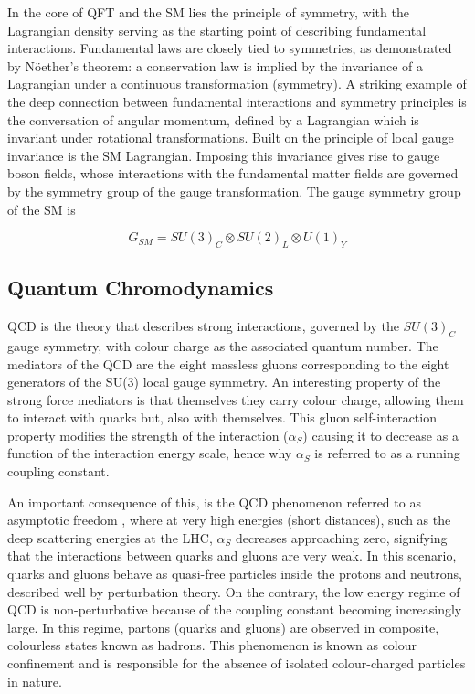 In the core of QFT and the SM lies the principle of symmetry, with the Lagrangian density serving as the starting point of describing fundamental interactions. Fundamental laws are closely tied to symmetries, as demonstrated by N\"{o}ether's theorem: a conservation law is implied by the invariance of a Lagrangian under a continuous transformation (symmetry). A striking example of the deep connection between fundamental interactions and symmetry principles is the conversation of angular momentum, defined by a Lagrangian which is invariant under rotational transformations. Built on the principle of local gauge invariance is the SM Lagrangian. Imposing this invariance gives rise to gauge boson fields, whose interactions with the fundamental matter fields are governed by the symmetry group of the gauge transformation. The gauge symmetry group of the SM is

\begin{equation}
G_{SM} = SU(3)_{C} \otimes SU(2)_{L} \otimes U(1)_{Y}
\end{equation}

\subsection{Quantum Chromodynamics}

\ac{QCD} is the theory that describes strong interactions, governed by the $SU(3)_{C}$ gauge symmetry, with colour charge as the associated quantum number. The mediators of the QCD are the eight massless gluons corresponding to the eight generators of the SU(3) local gauge symmetry. An interesting property of the strong force mediators is that themselves they carry colour charge, allowing them to interact with quarks but, also with themselves. This gluon self-interaction property modifies the strength of the interaction ($\alpha_{S}$) causing it to decrease as a function of the interaction energy scale, hence why $\alpha_{S}$ is referred to as a running coupling constant.

An important consequence of this, is the QCD phenomenon referred to as asymptotic freedom \cite{AsymptoticFreedom_1,AsymptoticFreedom_2}, where at very high energies (short distances), such as the deep scattering energies at the LHC, $\alpha_{S}$ decreases approaching zero, signifying that the interactions between quarks and gluons are very weak. In this scenario, quarks and gluons behave as quasi-free particles inside the protons and neutrons, described well by perturbation theory. On the contrary, the  low energy regime of QCD is non-perturbative because of the coupling constant becoming increasingly large. In this regime, partons (quarks and gluons) are observed in composite, colourless states known as hadrons. This phenomenon is known as colour confinement and is responsible for the absence of isolated colour-charged particles in nature. 

